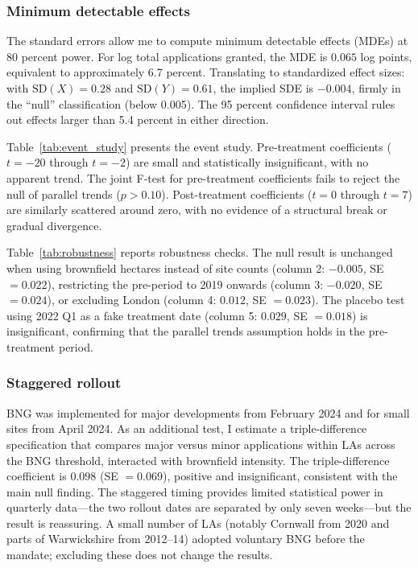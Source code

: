 \documentclass[12pt]{article}
\begin{document}
\subsubsection*{Minimum detectable effects} The standard errors allow me to compute minimum detectable effects (MDEs) at 80 percent power. For log total applications granted, the MDE is $0.065$ log points, equivalent to approximately 6.7 percent. Translating to standardized effect sizes: with $\text{SD}(X) = 0.28$ and $\text{SD}(Y) = 0.61$, the implied SDE is $-0.004$, firmly in the ``null'' classification (below 0.005). The 95 percent confidence interval rules out effects larger than 5.4 percent in either direction.



Table~\ref{tab:event_study} presents the event study. Pre-treatment coefficients ($t = -20$ through $t = -2$) are small and statistically insignificant, with no apparent trend. The joint F-test for pre-treatment coefficients fails to reject the null of parallel trends ($p > 0.10$). Post-treatment coefficients ($t = 0$ through $t = 7$) are similarly scattered around zero, with no evidence of a structural break or gradual divergence.



Table~\ref{tab:robustness} reports robustness checks. The null result is unchanged when using brownfield hectares instead of site counts (column 2: $-0.005$, SE $= 0.022$), restricting the pre-period to 2019 onwards (column 3: $-0.020$, SE $= 0.024$), or excluding London (column 4: $0.012$, SE $= 0.023$). The placebo test using 2022 Q1 as a fake treatment date (column 5: $0.029$, SE $= 0.018$) is insignificant, confirming that the parallel trends assumption holds in the pre-treatment period.

\subsubsection*{Staggered rollout} BNG was implemented for major developments from February 2024 and for small sites from April 2024. As an additional test, I estimate a triple-difference specification that compares major versus minor applications within LAs across the BNG threshold, interacted with brownfield intensity. The triple-difference coefficient is $0.098$ (SE $= 0.069$), positive and insignificant, consistent with the main null finding. The staggered timing provides limited statistical power in quarterly data---the two rollout dates are separated by only seven weeks---but the result is reassuring. A small number of LAs (notably Cornwall from 2020 and parts of Warwickshire from 2012--14) adopted voluntary BNG before the mandate; excluding these does not change the results.
\end{document}
